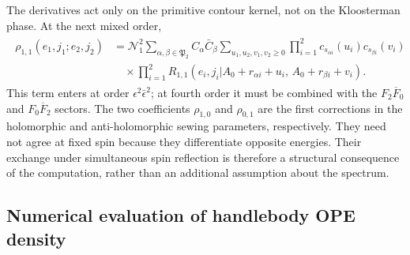 \documentclass[12 pt]{article}
\begin{document}
The derivatives act only on the primitive contour kernel, not on the Kloosterman phase.  At the next mixed order,
\begin{align}
\begin{split}
    \rho_{1,1}(e_1,j_1;e_2,j_2)
    &=
    \mathcal N_1^2
    \sum_{\alpha,\beta\in\mathfrak P_2}
    C_\alpha\bar C_\beta
    \sum_{u_1,u_2,v_1,v_2\ge0}
    \prod_{i=1}^2
    c_{s_{\alpha i}}(u_i)c_{s_{\beta i}}(v_i)\\
    &\quad\times
    \prod_{i=1}^2
    R_{1,1}
    \left(
    e_i,j_i\Big|
    A_0+r_{\alpha i}+u_i,\,
    A_0+r_{\beta i}+v_i
    \right).
\end{split}
\label{5.32jj}
\end{align}
This term enters at order \(\epsilon^2\bar\epsilon^2\); at fourth order it must be combined with the \(F_2\overline F_0\) and \(F_0\overline F_2\) sectors. The two coefficients $\rho_{1,0}$ and $\rho_{0,1}$ are the first corrections in the holomorphic and anti-holomorphic sewing parameters, respectively.  They need not agree at fixed spin because they differentiate opposite energies.  Their exchange under simultaneous spin reflection is therefore a structural consequence of the computation, rather than an additional assumption about the spectrum.


\subsection{Numerical evaluation of handlebody OPE density }
\end{document}
